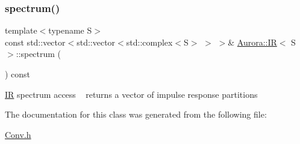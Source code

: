 \subsubsection{\texorpdfstring{spectrum()}{spectrum()}}
{\footnotesize\ttfamily template$<$typename S$>$ \\
const std\+::vector$<$std\+::vector$<$std\+::complex$<$S$>$ $>$ $>$\& \hyperlink{class_aurora_1_1_i_r}{Aurora\+::\+IR}$<$ S $>$\+::spectrum (\begin{DoxyParamCaption}{ }\end{DoxyParamCaption}) const\hspace{0.3cm}{\ttfamily [inline]}}

\hyperlink{class_aurora_1_1_i_r}{IR} spectrum access ~\newline
returns a vector of impulse response partitions 

The documentation for this class was generated from the following file\+:\begin{DoxyCompactItemize}
\item 
\hyperlink{_conv_8h}{Conv.\+h}\end{DoxyCompactItemize}
